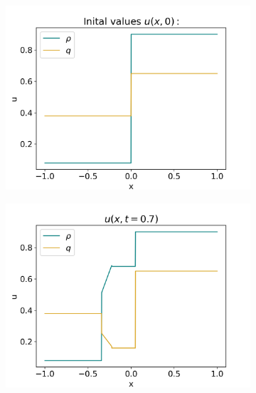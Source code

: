 \documentclass[10pt]{article}
\numberwithin{equation}{section}
\begin{document}
\begin{figure}[H]
     \centering
     \begin{subfigure}[t]{0.35\textwidth}
         \centering
         \includegraphics[width=\textwidth]{Figures/Model/Plots/Sys3bIV.png}
     \end{subfigure}
     \begin{subfigure}[t]{0.35\textwidth}
         \centering
         \includegraphics[width=\textwidth]{Figures/Model/Plots/Sys3bAtTime.png}
     \end{subfigure}
     \hfill 
     \begin{subfigure}[b]{0.35\textwidth}
         \centering

\end{subfigure}
\end{figure}
\end{document}
